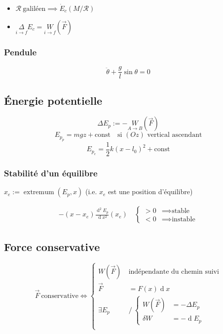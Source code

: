 \documentclass{article}
\renewcommand{\d}{\operatorname{d}}
\renewcommand{\vec}{\overrightarrow}
\begin{document}
\begin{itemize}
	\item $\mathcal{R}\ \text{galiléen} \implies \dot E_c(M/\mathcal R)$
	\item $\underset{i\to f}{\Delta}E_c = \underset{i\to f}{W}(\vec F)$
\end{itemize}	

\subsubsection{Pendule}
\[
	\ddot\theta + \frac{g}{l} \sin\theta = 0
\] 

\subsection{Énergie potentielle}

\[
	\Delta E_p := -\underset{A\to B}{W}(\vec F)
\] 
\[
	E_{p_p} = mgz + \text{const}\quad\text{si $(Oz)$ vertical ascendant}
\] 
\[
	E_{p_e} = \frac{1}{2}k(x-l_0)^2+\text{const}
\] 

\subsubsection{Stabilité d'un équilibre}

$x_e := \operatorname{extremum}(E_p, x)$ (i.e. $x_e$ est une position d'équilibre)

\begin{align*}
	-(x-x_e)\frac{\d^2 {E_p}}{\d x^2}(x_e)\quad \begin{cases}
		> 0 &\implies \text{stable} \\
		< 0 &\implies \text{instable}
	\end{cases}
\end{align*}

\subsection{Force conservative}
\[
	\vec F\ \text{conservative} \iff \begin{cases}
		W(\vec F)\ &\text{indépendante du chemin suivi} \\
		\vec F &= F(x)\d x \\
		\exists E_p \ &\text{/}\ \begin{cases}
			W(\vec F) &= -\Delta E_p \\
			\delta W &= -\d E_p
		\end{cases} \\
	\end{cases}
\] 
\end{document}
